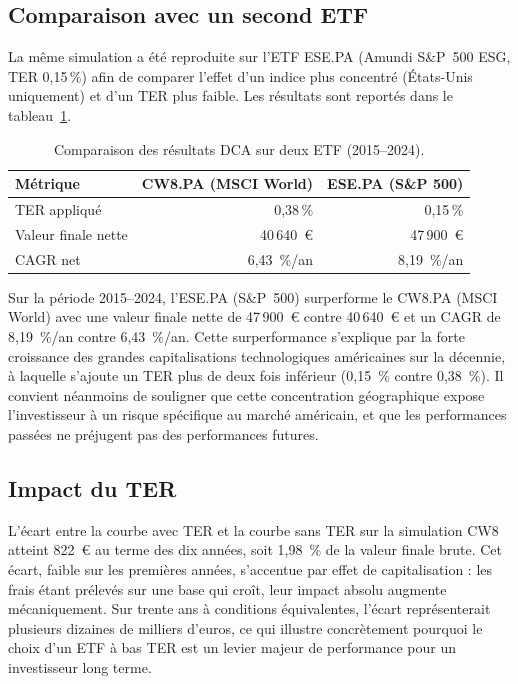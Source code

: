 \documentclass[11pt,a4paper]{article}
\begin{document}
\subsection{Comparaison avec un second ETF}
\label{subsec:dca-comparaison}

La même simulation a été reproduite sur l'ETF ESE.PA (Amundi S\&P~500
ESG, TER 0{,}15\,\%) afin de comparer l'effet d'un indice plus
concentré (États-Unis uniquement) et d'un TER plus faible. Les résultats
sont reportés dans le tableau~\ref{tab:dca-comparaison}.

\begin{table}[h]
\centering
\caption{Comparaison des résultats DCA sur deux ETF (2015--2024).}
\label{tab:dca-comparaison}
\begin{tabularx}{\linewidth}{l r r}
\toprule
Métrique & CW8.PA (MSCI World) & ESE.PA (S\&P 500) \\
\midrule
TER appliqué & 0{,}38\,\% & 0{,}15\,\% \\
Valeur finale nette & 40\,640~€ & 47\,900~€ \\
CAGR net & 6,43~\%/an & 8,19~\%/an \\
\bottomrule
\end{tabularx}
\end{table}

Sur la période 2015--2024, l'ESE.PA (S\&P~500) surperforme le CW8.PA (MSCI World) avec une valeur
finale nette de 47\,900~€ contre 40\,640~€ et un CAGR de 8,19~\%/an contre 6,43~\%/an. Cette
surperformance s'explique par la forte croissance des grandes capitalisations technologiques
américaines sur la décennie, à laquelle s'ajoute un TER plus de deux fois inférieur
(0,15~\% contre 0,38~\%). Il convient néanmoins de souligner que cette concentration
géographique expose l'investisseur à un risque spécifique au marché américain, et que
les performances passées ne préjugent pas des performances futures.

\subsection{Impact du TER}

L'écart entre la courbe \og avec TER \fg et la courbe \og sans TER \fg
sur la simulation CW8 atteint 822~€ au terme des dix années,
soit 1,98~\% de la valeur finale brute. Cet écart, faible
sur les premières années, s'accentue par effet de capitalisation : les
frais étant prélevés sur une base qui croît, leur impact absolu augmente
mécaniquement. Sur trente ans à conditions équivalentes, l'écart
représenterait plusieurs dizaines de milliers d'euros, ce qui illustre
concrètement pourquoi le choix d'un ETF à bas TER est un levier majeur
de performance pour un investisseur long terme.
\end{document}
